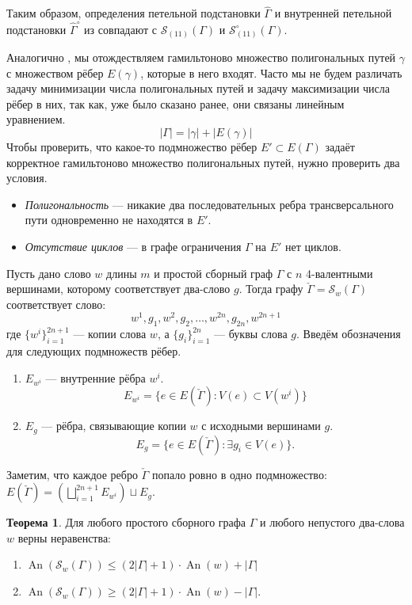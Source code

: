 \documentclass{article}
\theoremstyle{definition}
\newtheorem{theorem}{Теорема}[section]
\newcommand{\An}{\operatorname{An}}
\newcommand{\hGamma}{\hat{\Gamma}}
\begin{document}
Таким образом, определения петельной подстановки $\hGamma$ и внутренней петельной подстановки $\hGamma^\circ$ из \cite{Muche2012} совпадают с $\mathcal{S}_{(11)}(\Gamma)$ и $\mathcal{S}^{\circ}_{(11)}(\Gamma)$.

Аналогично \cite{MaksaevPreprint}, мы отождествляем гамильтоново множество полигональных путей $\gamma$ с множеством рёбер $E(\gamma)$, которые в него входят. Часто мы не будем различать задачу минимизации числа полигональных путей и задачу максимизации числа рёбер в них, так как, уже было сказано ранее, они связаны линейным уравнением.
\[
    |\Gamma| = |\gamma| + |E(\gamma)|
\]
Чтобы проверить, что какое-то подмножество рёбер $E' \subset E(\Gamma)$ задаёт корректное гамильтоново множество полигональных путей, нужно проверить два условия.
\begin{itemize}
    \item \emph{Полигональность} — никакие два последовательных ребра трансверсального пути одновременно не находятся в $E'$. 
    \item \emph{Отсутствие циклов} — в графе ограничения $\Gamma$ на $E'$ нет циклов. 
\end{itemize}

Пусть дано слово $w$ длины $m$ и простой сборный граф $\Gamma$ с $n$ 4-валентными вершинами, которому соответствует два-слово $g$. Тогда графу $\check{\Gamma} = \mathcal{S}_w(\Gamma)$ соответствует слово:
\[
w^1,g_1,w^2,g_2,\dots,w^{2n},g_{2n},w^{2n + 1}
\]
где $\{w^i\}_{i = 1}^{2n + 1}$ — копии слова $w$, а $\{g_i\}_{i = 1}^{2n}$ — буквы слова $g$. 
Введём обозначения для следующих подмножеств рёбер.

\begin{enumerate}
    \item $E_{w^i}$ — внутренние рёбра $w^i$.
    \[
        E_{w^i}= \{e \in E(\check{\Gamma}) : V(e) \subset V(w^i)\}
    \]
    \item $E_{g}$ — рёбра, связывающие копии $w$ с исходными вершинами $g$.
    \[
        E_{g} = \{e \in E(\check{\Gamma}): \exists g_i \in V(e)\}. 
    \]
\end{enumerate}

Заметим, что каждое ребро $\check{\Gamma}$ попало ровно в одно подмножество:  $E(\check{\Gamma}) = (\bigsqcup_{i=1}^{2n + 1} E_{w^i}) \sqcup E_g$.

\begin{theorem}\label{theor:an-saturation} 
    Для любого простого сборного графа $\Gamma$ и любого непустого два-слова $w$ верны неравенства:
    
    \begin{enumerate}
        \item $\An(\mathcal{S}_w(\Gamma)) \leq (2|\Gamma| + 1)\cdot\An(w) + |\Gamma|$
        \item $\An(\mathcal{S}_w(\Gamma)) \geq (2|\Gamma| + 1)\cdot\An(w) - |\Gamma| $.
    \end{enumerate}
\end{theorem}
\end{document}
